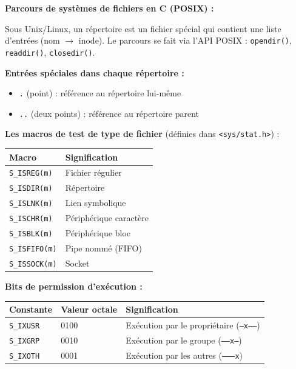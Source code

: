 \documentclass[a4paper,11pt]{article}
\theoremstyle{plain}
\theoremstyle{definition}
\begin{document}
\begin{rappel}
\textbf{Parcours de systèmes de fichiers en C (POSIX) :}

Sous Unix/Linux, un répertoire est un fichier spécial qui contient une liste d'entrées (nom $\rightarrow$ inode). Le parcours se fait via l'API POSIX : \texttt{opendir()}, \texttt{readdir()}, \texttt{closedir()}.

\medskip
\textbf{Entrées spéciales dans chaque répertoire :}
\begin{itemize}
    \item \texttt{.} (point) : référence au répertoire lui-même
    \item \texttt{..} (deux points) : référence au répertoire parent
\end{itemize}

\medskip
\textbf{Les macros de test de type de fichier} (définies dans \texttt{<sys/stat.h>}) :
\begin{center}
\begin{tabular}{ll}
\toprule
\textbf{Macro} & \textbf{Signification} \\
\midrule
\texttt{S\_ISREG(m)} & Fichier régulier \\
\texttt{S\_ISDIR(m)} & Répertoire \\
\texttt{S\_ISLNK(m)} & Lien symbolique \\
\texttt{S\_ISCHR(m)} & Périphérique caractère \\
\texttt{S\_ISBLK(m)} & Périphérique bloc \\
\texttt{S\_ISFIFO(m)} & Pipe nommé (FIFO) \\
\texttt{S\_ISSOCK(m)} & Socket \\
\bottomrule
\end{tabular}
\end{center}

\medskip
\textbf{Bits de permission d'exécution :}
\begin{center}
\begin{tabular}{lll}
\toprule
\textbf{Constante} & \textbf{Valeur octale} & \textbf{Signification} \\
\midrule
\texttt{S\_IXUSR} & 0100 & Exécution par le propriétaire (\texttt{--x------}) \\
\texttt{S\_IXGRP} & 0010 & Exécution par le groupe (\texttt{-----x---}) \\
\texttt{S\_IXOTH} & 0001 & Exécution par les autres (\texttt{--------x}) \\
\bottomrule
\end{tabular}
\end{center}


\end{rappel}
\end{document}
